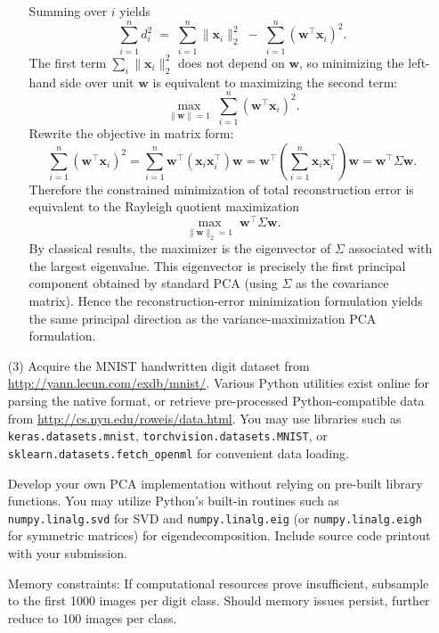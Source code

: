 \documentclass[11pt,addpoints,answers]{exam}
\begin{document}
\begin{enumerate}
\begin{enumerate}
\begin{your_solution}
				Summing over \(i\) yields
				\[
				\sum_{i=1}^n d_i^2 \;=\; \sum_{i=1}^n \|\mathbf{x}_i\|_2^2 \;-\; \sum_{i=1}^n (\mathbf w^\top \mathbf{x}_i)^2.
				\]
				The first term \(\sum_i \|\mathbf{x}_i\|_2^2\) does not depend on \(\mathbf w\), so minimizing the left-hand side over unit \(\mathbf w\) is equivalent to maximizing the second term:
				\[
				\max_{\|\mathbf w\|=1} \; \sum_{i=1}^n (\mathbf w^\top \mathbf{x}_i)^2.
				\]
				Rewrite the objective in matrix form:
				\[
				\sum_{i=1}^n (\mathbf w^\top \mathbf{x}_i)^2
				= \sum_{i=1}^n \mathbf w^\top (\mathbf{x}_i\mathbf{x}_i^\top)\mathbf w
				= \mathbf w^\top \left(\sum_{i=1}^n \mathbf{x}_i\mathbf{x}_i^\top\right)\mathbf w
				= \mathbf w^\top \Sigma \mathbf w.
				\]
				Therefore the constrained minimization of total reconstruction error is equivalent to the Rayleigh quotient maximization
				\[
				\max_{\|\mathbf w\|_2 = 1} \; \mathbf w^\top \Sigma \mathbf w.
				\]
				By classical results, the maximizer is the eigenvector of \(\Sigma\) associated with the largest eigenvalue. This eigenvector is precisely the first principal component obtained by standard PCA (using \(\Sigma\) as the covariance matrix). Hence the reconstruction-error minimization formulation yields the same principal direction as the variance-maximization PCA formulation.

			\end{your_solution}
		\end{enumerate}
		
		
		\item[(3)] Acquire the MNIST handwritten digit dataset from \url{http://yann.lecun.com/exdb/mnist/}. Various Python utilities exist online for parsing the native format, or retrieve pre-processed Python-compatible data from \url{http://cs.nyu.edu/roweis/data.html}. You may use libraries such as \texttt{keras.datasets.mnist}, \texttt{torchvision.datasets.MNIST}, or\\ \texttt{sklearn.datasets.fetch\_openml} for convenient data loading.
		
		Develop your own PCA implementation without relying on pre-built library functions. You may utilize Python's built-in routines such as \texttt{numpy.linalg.svd} for SVD and \texttt{numpy.linalg.eig} (or \texttt{numpy.linalg.eigh} for symmetric matrices) for eigendecomposition. Include source code printout with your submission.
		
		Memory constraints: If computational resources prove insufficient, subsample to the first 1000 images per digit class. Should memory issues persist, further reduce to 100 images per class.
		

\end{enumerate}
\end{document}
